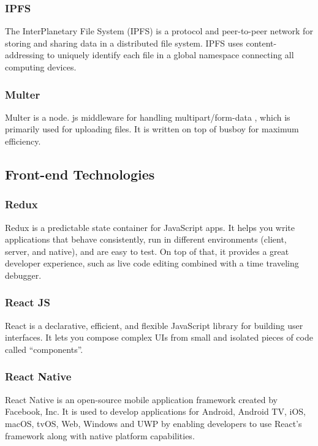     \subsubsection{IPFS}
    The InterPlanetary File System (IPFS) is a protocol and peer-to-peer network for storing and sharing data in a distributed file system. 
    IPFS uses content-addressing to uniquely identify each file in a global namespace connecting all computing devices.

    \subsubsection{Multer}
    Multer is a node. js middleware for handling multipart/form-data , 
    which is primarily used for uploading files. It is written on top of busboy for maximum efficiency.

\subsection{Front-end Technologies}

    \subsubsection{Redux}
    Redux is a predictable state container for JavaScript apps.
    It helps you write applications that behave consistently, run in different environments 
    (client, server, and native), and are easy to test. On top of that, it provides a great developer experience, 
    such as live code editing combined with a time traveling debugger.
    
    \subsubsection{React JS}
    React is a declarative, efficient, and flexible JavaScript library for building user interfaces. 
    It lets you compose complex UIs from small and isolated pieces of code called “components”.

    \subsubsection{React Native}
    React Native is an open-source mobile application framework created by Facebook, Inc.
    It is used to develop applications for Android, Android TV, iOS, macOS, tvOS, Web, Windows and UWP by enabling 
    developers to use React's framework along with native platform capabilities.

